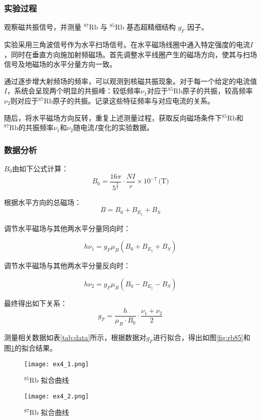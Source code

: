 \subsubsection{实验过程}
观察磁共振信号，并测量 $^{87}\text{Rb}$ 与 $^{85}\text{Rb}$ 基态超精细结构 $g_F$ 因子。

实验采用三角波信号作为水平扫场信号。在水平磁场线圈中通入特定强度的电流$I$，同时在垂直方向施加射频磁场。首先调整水平线圈产生的磁场方向，使其与扫场信号及地磁场的水平分量方向一致。

通过逐步增大射频场的频率，可以观测到核磁共振现象。对于每一个给定的电流值$I$，系统会呈现两个明显的共振峰：较低频率$\nu_{1}$对应于${}^{85}\text{Rb}$原子的共振，较高频率$\nu_{2}$则对应于${}^{87}\text{Rb}$原子的共振。记录这些特征频率与对应电流的关系。

随后，将水平磁场方向反转，重复上述测量过程，获取反向磁场条件下${}^{85}\text{Rb}$和${}^{87}\text{Rb}$的共振频率$\nu_{1}$和$\nu_{2}$随电流$I$变化的实验数据。

\subsubsection{数据分析}
$B_0$由如下公式计算：
$$ B_{0} = \frac{16\pi}{5^{\frac{3}{2}}} \cdot \frac{N I}{r} \times 10^{-7} \, \text{(T)} $$

根据水平方向的总磁场：
$$ B = B_{0} + B_{E_{\parallel}} + B_{S} $$

调节水平磁场与其他两水平分量同向时：

$$h \nu_{1} = g_{F} \mu_{B}(B_{0} + B_{E_{\parallel}} + B_{S}) $$

调节水平磁场与其他两水平分量反向时：

$$h \nu_{2} = g_{F} \mu_{B}(B_{0} - B_{E_{\parallel}} - B_{S})$$


最终得出如下关系：$$ g_{F} = \frac{h}{\mu_{B} \cdot B_0} \cdot \frac{\nu_{1} + \nu_{2}}{2} $$

测量相关数据如表\ref{tab:data}所示，根据数据对$g_F$进行拟合，得出如图\ref{fig:rb85}和图\ref{fig:rb87}的拟合结果。



\begin{figure}[H]
    \centering
    \begin{minipage}{0.45\textwidth}
        \centering
        \texttt{[image: ex4\_1.png]}
        \caption{$^{85}$Rb 拟合曲线}
        \label{fig:rb85}
    \end{minipage}
    \hfill
    \begin{minipage}{0.45\textwidth}
        \centering
        \texttt{[image: ex4\_2.png]}
        \caption{$^{87}$Rb 拟合曲线}
        \label{fig:rb87}
    \end{minipage}
\end{figure}

